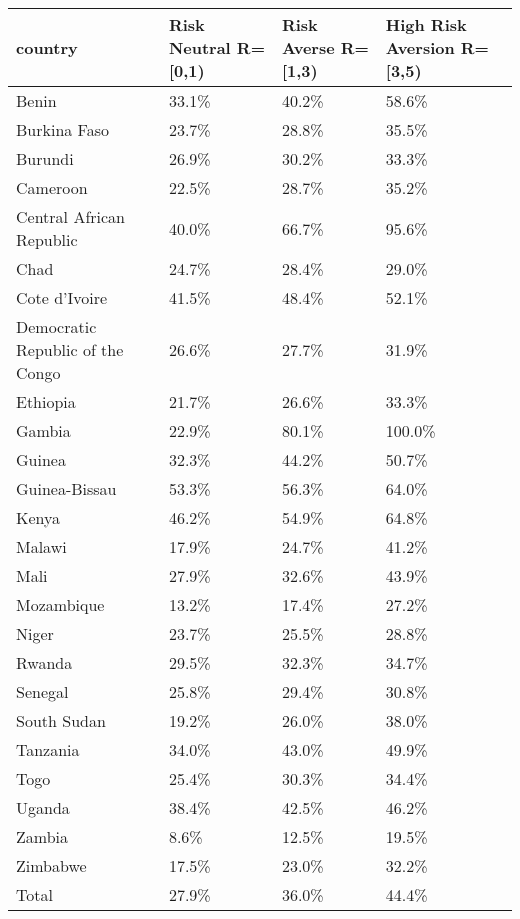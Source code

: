 \begin{table}[ht]
\centering
\begin{tabular}{llll}
  \hline
country & Risk Neutral R=[0,1) & Risk Averse R=[1,3) & High Risk Aversion R=[3,5) \\ 
  \hline
Benin & 33.1\% & 40.2\% & 58.6\% \\ 
  Burkina Faso & 23.7\% & 28.8\% & 35.5\% \\ 
  Burundi & 26.9\% & 30.2\% & 33.3\% \\ 
  Cameroon & 22.5\% & 28.7\% & 35.2\% \\ 
  Central African Republic & 40.0\% & 66.7\% & 95.6\% \\ 
  Chad & 24.7\% & 28.4\% & 29.0\% \\ 
  Cote d'Ivoire & 41.5\% & 48.4\% & 52.1\% \\ 
  Democratic Republic of the Congo & 26.6\% & 27.7\% & 31.9\% \\ 
  Ethiopia & 21.7\% & 26.6\% & 33.3\% \\ 
  Gambia & 22.9\% & 80.1\% & 100.0\% \\ 
  Guinea & 32.3\% & 44.2\% & 50.7\% \\ 
  Guinea-Bissau & 53.3\% & 56.3\% & 64.0\% \\ 
  Kenya & 46.2\% & 54.9\% & 64.8\% \\ 
  Malawi & 17.9\% & 24.7\% & 41.2\% \\ 
  Mali & 27.9\% & 32.6\% & 43.9\% \\ 
  Mozambique & 13.2\% & 17.4\% & 27.2\% \\ 
  Niger & 23.7\% & 25.5\% & 28.8\% \\ 
  Rwanda & 29.5\% & 32.3\% & 34.7\% \\ 
  Senegal & 25.8\% & 29.4\% & 30.8\% \\ 
  South Sudan & 19.2\% & 26.0\% & 38.0\% \\ 
  Tanzania & 34.0\% & 43.0\% & 49.9\% \\ 
  Togo & 25.4\% & 30.3\% & 34.4\% \\ 
  Uganda & 38.4\% & 42.5\% & 46.2\% \\ 
  Zambia & 8.6\% & 12.5\% & 19.5\% \\ 
  Zimbabwe & 17.5\% & 23.0\% & 32.2\% \\ 
  Total & 27.9\% & 36.0\% & 44.4\% \\ 
   \hline
\end{tabular}
\end{table}
